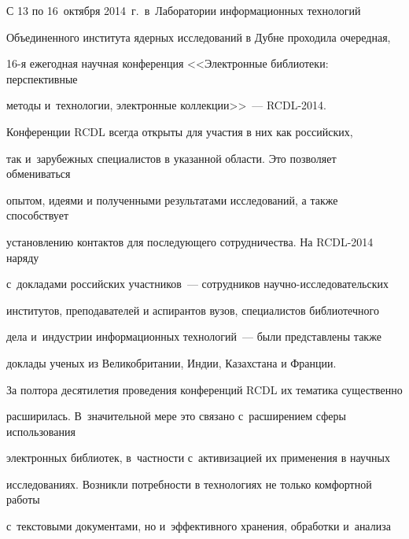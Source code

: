 \vspace*{6pt}



















С 13 по 16~октября 2014~г.\ в~Лаборатории информационных технологий


Объединенного института ядерных исследований в Дубне проходила очередная,


16-я ежегодная научная конференция <<Электронные библиотеки: перспективные


методы и~технологии, электронные коллекции>>~--- RCDL-2014.





Конференции RCDL всегда открыты для участия в них как российских,


так и~зарубежных специалистов в указанной области. Это позволяет обмениваться


опытом, идеями и полученными результатами исследований, а также способствует


установлению контактов для последующего сотрудничества. На RCDL-2014 наряду


с~докладами российских участников~--- сотрудников на\-уч\-но-ис\-сле\-до\-ва\-тель\-ских


институтов, преподавателей и аспирантов вузов, специалистов библиотечного


дела и~индустрии информационных технологий~--- были представлены также


доклады ученых из Великобритании, Индии, Казахстана и Франции.





За полтора десятилетия проведения конференций RCDL их тематика существенно


расширилась. В~значительной мере это связано с~расширением сферы использования


электронных библиотек, в~частности с~активизацией их применения в научных


исследованиях. Возникли потребности в технологиях не только комфортной работы


с~текстовыми документами, но и~эффективного хранения, обработки и~анализа


